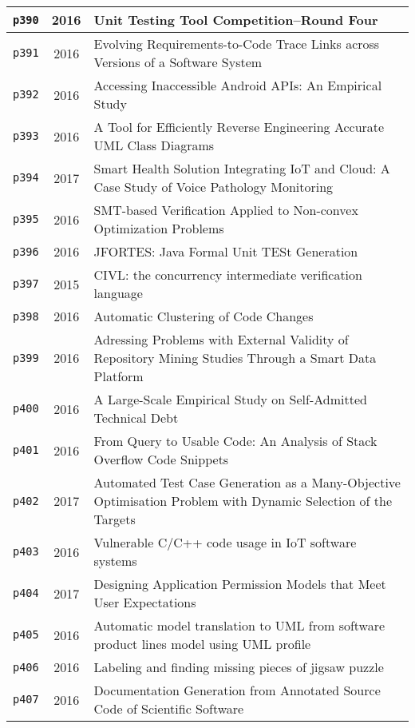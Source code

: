 \begin{longtable}{| c | c | p{16cm} |}
  \hline
  \texttt{p390} & 2016 & Unit Testing Tool Competition--Round Four \\
  \hline
  \texttt{p391} & 2016 & Evolving Requirements-to-Code Trace Links across Versions of a Software System \\
  \hline
  \texttt{p392} & 2016 & Accessing Inaccessible Android APIs: An Empirical Study \\
  \hline
  \texttt{p393} & 2016 & A Tool for Efficiently Reverse Engineering Accurate UML Class Diagrams \\
  \hline
  \texttt{p394} & 2017 & Smart Health Solution Integrating IoT and Cloud: A Case Study of Voice Pathology Monitoring \\
  \hline
  \texttt{p395} & 2016 & SMT-based Verification Applied to Non-convex Optimization Problems \\
  \hline
  \texttt{p396} & 2016 & JFORTES: Java Formal Unit TESt Generation \\
  \hline
  \texttt{p397} & 2015 & CIVL: the concurrency intermediate verification language \\
  \hline
  \texttt{p398} & 2016 & Automatic Clustering of Code Changes \\
  \hline
  \texttt{p399} & 2016 & Adressing Problems with External Validity of Repository Mining Studies Through a Smart Data Platform \\
  \hline
  \texttt{p400} & 2016 & A Large-Scale Empirical Study on Self-Admitted Technical Debt \\
  \hline
  \texttt{p401} & 2016 & From Query to Usable Code: An Analysis of Stack Overflow Code Snippets \\
  \hline
  \texttt{p402} & 2017 & Automated Test Case Generation as a Many-Objective Optimisation Problem with Dynamic Selection of the Targets \\
  \hline
  \texttt{p403} & 2016 & Vulnerable C/C++ code usage in IoT software systems \\
  \hline
  \texttt{p404} & 2017 & Designing Application Permission Models that Meet User Expectations \\
  \hline
  \texttt{p405} & 2016 & Automatic model translation to UML from software product lines model using UML profile \\
  \hline
  \texttt{p406} & 2016 & Labeling and finding missing pieces of jigsaw puzzle \\
  \hline
  \texttt{p407} & 2016 & Documentation Generation from Annotated Source Code of Scientific Software \\

\end{longtable}
